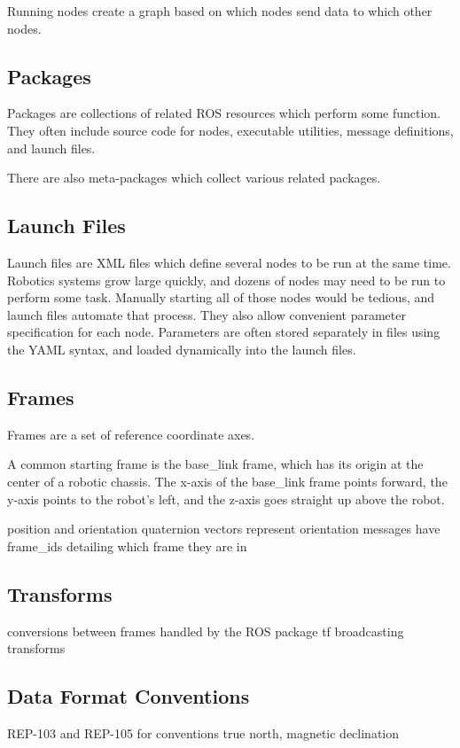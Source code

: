 Running nodes create a graph based on which nodes send data to which other nodes.

\subsection{Packages}
Packages are collections of related ROS resources which perform some function. They often include source code for nodes, executable utilities, message definitions, and launch files.

There are also meta-packages which collect various related packages.

\subsection{Launch Files}
Launch files are XML files which define several nodes to be run at the same time. Robotics systems grow large quickly, and dozens of nodes may need to be run to perform some task. Manually starting all of those nodes would be tedious, and launch files automate that process. They also allow convenient parameter specification for each node. Parameters are often stored separately in files using the YAML syntax, and loaded dynamically into the launch files.

\subsection{Frames}
Frames are a set of reference coordinate axes.

A common starting frame is the base\_link frame, which has its origin at the center of a robotic chassis. The x-axis of the base\_link frame points forward, the y-axis points to the robot's left, and the z-axis goes straight up above the robot.


position and orientation
quaternion vectors represent orientation
messages have frame\_ids detailing which frame they are in

\subsection{Transforms}
conversions between frames
handled by the ROS package tf
broadcasting transforms

\subsection{Data Format Conventions}
REP-103 and REP-105 for conventions
true north, magnetic declination

